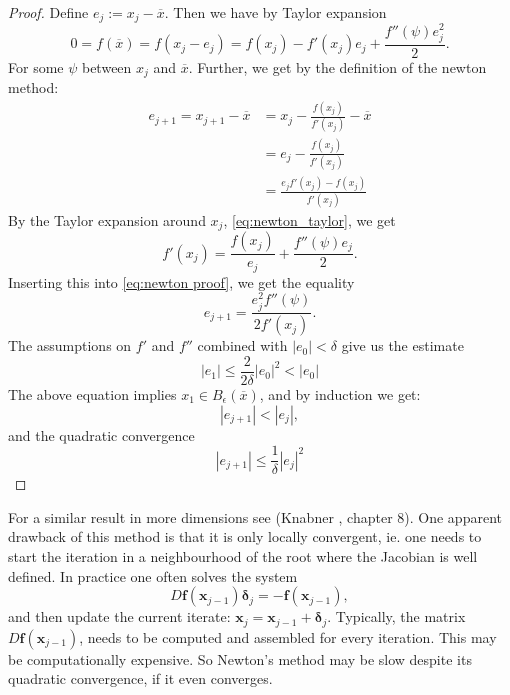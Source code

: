 \documentclass[../Main/main.tex]{subfiles}
\begin{document}
\begin{proof}
	Define $e_j:=x_j-\overline{x}$. Then we have by Taylor expansion
	\begin{equation}\label{eq:newton_taylor}
		0 = f(\overline{x})=f(x_j-e_j) = f(x_j)-f'(x_j)e_j + \frac{f''(\psi)e_j^2}{2}.
	\end{equation}
	For some $\psi$ between $x_j$ and $\overline{x}$. Further, we get by the definition of the newton method:
	\begin{equation}\label{eq:newton proof}
		\begin{aligned}
			e_{j+1} = x_{j+1}-\overline{x} &= x_j-\frac{f(x_j)}{f'(x_j)}-\overline{x}\\
			&=e_j - \frac{f(x_j)}{f'(x_j)}\\ &= \frac{e_j f'(x_j)-f(x_j)}{f'(x_j)}
		\end{aligned}
	\end{equation}
	By the Taylor expansion around $x_j$, \eqref{eq:newton_taylor}, we get
	\begin{equation}
		f'(x_j)=\frac{f(x_j)}{e_j} + \frac{f''(\psi)e_j}{2}.
	\end{equation}
	Inserting this into \eqref{eq:newton proof}, we get the equality
	\begin{equation}
		e_{j+1} = \frac{e_j^2f''(\psi)}{2f'(x_j)}.
	\end{equation}
	The assumptions on $f'$ and  $f''$ combined with $|e_0|<\delta$ give us the estimate
	\begin{equation}
		| e_{1} | \leq \frac{2}{2\delta}|e_0|^2<|e_0|
	\end{equation}
	The above equation implies $x_1\in B_{\epsilon}(\overline{x})$, and by induction we get:
	\begin{equation}
		|e_{j+1}|<|e_j|,
	\end{equation}
	and the quadratic convergence
	\begin{equation}
		| e_{j+1} | \leq \frac{1}{\delta}|e_j|^2
	\end{equation}
\end{proof}
For a similar result in more dimensions see (Knabner \cite{Knabner}, chapter 8). One apparent drawback of this method is that it is only locally convergent, ie. one needs to start the iteration in a neighbourhood of the root where the Jacobian is well defined. In practice one often solves the system
\begin{equation}
	D\pmb{f}(\pmb{x}_{j-1})\pmb{\delta}_{j} = -\pmb{f}(\pmb{x}_{j-1}),
\end{equation}
and then update the current iterate: $\pmb{x}_j = \pmb{x}_{j-1} + \pmb{\delta}_{j}$. Typically, the matrix $D\pmb{f}(\pmb{x}_{j-1})$, needs to be computed and assembled for every iteration. This may be computationally expensive. So Newton's method may be slow despite its quadratic convergence, if it even converges.\par 
\end{document}
